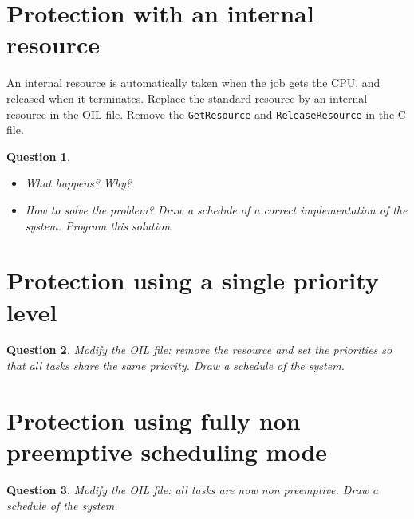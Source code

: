 \documentclass[11pt]{report}
\newtheorem{ex}{Question}
\begin{document}



\section{Protection with an internal resource}

An internal resource is automatically taken when the job gets the CPU, and released when it terminates. Replace the standard resource by an internal resource in the OIL file. Remove the \texttt{GetResource} and \texttt{ReleaseResource} in the C file.

\begin{ex}~
  \begin{itemize}
    \item
      What happens? Why?
    \item
      How to solve the problem? Draw a schedule of a correct implementation of the system. Program this solution.
  \end{itemize}
\end{ex}


\section{Protection using a single priority level}

\begin{ex}
  Modify the OIL file: remove the resource and set the priorities so that all tasks share the same priority. Draw a schedule of the system.
\end{ex}

\section{Protection using fully non preemptive scheduling mode}

\begin{ex}
  Modify the OIL file: all tasks are now non preemptive. Draw a schedule of the system.
\end{ex}

\end{document}

